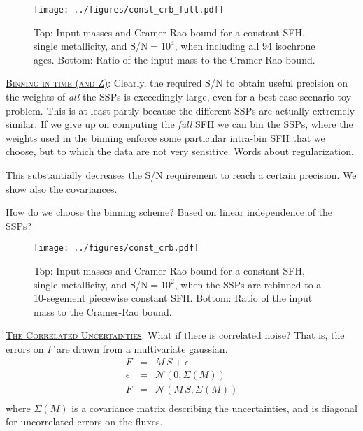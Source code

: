 \documentclass{article}
\begin{document}
\begin{figure*}[h!]
\texttt{[image: ../figures/const\_crb\_full.pdf]}
\caption{Top: Input masses and Cramer-Rao bound for a constant SFH, single metallicity, and S/N$= 10^4$, when including all 94 isochrone ages.  Bottom: Ratio of the input mass to the Cramer-Rao bound. 
\label{fig:example}}
\end{figure*}



\underline{\textsc{Binning in time (and Z)}}:
Clearly, the required S/N to obtain useful precision on the weights of \emph{all} the SSPs is exceedingly large, even for a best case scenario toy problem.  
This is at least partly because the different SSPs are actually extremely similar.  
If we give up on computing the \emph{full} SFH we can bin the SSPs, 
where the weights used in the binning enforce some particular intra-bin SFH that we choose, but to which the data are not very sensitive.
Words about regularization.

This substantially decreases the S/N requirement to reach a certain precision.  We show also the covariances.

How do we choose the binning scheme?  Based on linear independence of the SSPs?

\begin{figure*}[h!]
\texttt{[image: ../figures/const\_crb.pdf]}
\caption{Top: Input masses and Cramer-Rao bound for a constant SFH, single metallicity, and S/N$= 10^2$, when the SSPs are rebinned to a 10-segement piecewise constant SFH.  Bottom: Ratio of the input mass to the Cramer-Rao bound. 
\label{fig:example_bin}}
\end{figure*}



\underline{\textsc{The Correlated Uncertainties}}:
What if there is correlated noise? That is, the errors on $F$ are drawn from a multivariate gaussian.
\begin{eqnarray}
F & = & M \, S + \epsilon \\
\epsilon & = & \mathcal{N}(0, \Sigma(M)) \\
F & = & \mathcal{N}(M \, S, \Sigma(M)) \\
\end{eqnarray}
where $\Sigma(M)$ is a covariance matrix describing the uncertainties, and is diagonal for uncorrelated errors on the fluxes.
\end{document}
